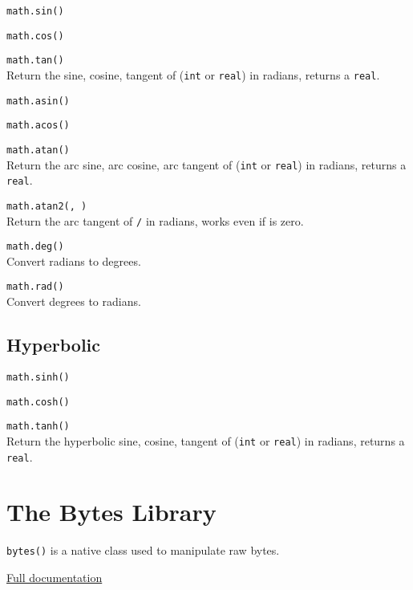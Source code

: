 \hangpar \texttt{math.sin(}\texttt{)}

\hangpar \texttt{math.cos(}\texttt{)}

\hangpar \texttt{math.tan(}\texttt{)}\\
Return the sine, cosine, tangent of  (\texttt{int} or \texttt{real}) in radians, returns a \texttt{real}.

\hangpar \texttt{math.asin(}\texttt{)}

\hangpar \texttt{math.acos(}\texttt{)}

\hangpar \texttt{math.atan(}\texttt{)}\\
Return the arc sine, arc cosine, arc tangent of  (\texttt{int} or \texttt{real}) in radians, returns a \texttt{real}.

\hangpar \texttt{math.atan2(}\texttt{, }\texttt{)}\\
Return the arc tangent of  \texttt{/}  in radians, works even if  is zero.

\hangpar \texttt{math.deg(}\texttt{)}\\
Convert radians to degrees.

\hangpar \texttt{math.rad(}\texttt{)}\\
Convert degrees to radians.

\subsection*{Hyperbolic}

\hangpar \texttt{math.sinh(}\texttt{)}

\hangpar \texttt{math.cosh(}\texttt{)}

\hangpar \texttt{math.tanh(}\texttt{)}\\
Return the hyperbolic sine, cosine, tangent of  (\texttt{int} or \texttt{real}) in radians, returns a \texttt{real}.

\section*{The Bytes Library}

\texttt{bytes()} is a native class used to manipulate raw bytes.

\hangpar \href{https://github.com/berry-lang/berry/wiki/Chapter-7\#bytes-class}{Full documentation}

